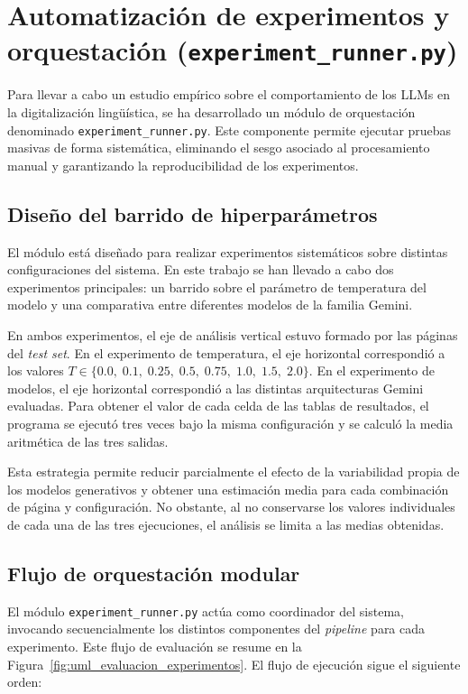 \section{Automatización de experimentos y orquestación (\texttt{experiment\_runner.py})}

Para llevar a cabo un estudio empírico sobre el comportamiento de los LLMs en la digitalización lingüística, se ha desarrollado un módulo de orquestación denominado \texttt{experiment\_runner.py}. Este componente permite ejecutar pruebas masivas de forma sistemática, eliminando el sesgo asociado al procesamiento manual y garantizando la reproducibilidad de los experimentos.

\subsection{Diseño del barrido de hiperparámetros}

El módulo está diseñado para realizar experimentos sistemáticos sobre distintas configuraciones del sistema. En este trabajo se han llevado a cabo dos experimentos principales: un barrido sobre el parámetro de temperatura del modelo y una comparativa entre diferentes modelos de la familia Gemini.

En ambos experimentos, el eje de análisis vertical estuvo formado por las páginas del \textit{test set}. En el experimento de temperatura, el eje horizontal correspondió a los valores \(T \in \{0.0,\;0.1,\;0.25,\;0.5,\;0.75,\;1.0,\;1.5,\;2.0\}\). En el experimento de modelos, el eje horizontal correspondió a las distintas arquitecturas Gemini evaluadas. Para obtener el valor de cada celda de las tablas de resultados, el programa se ejecutó tres veces bajo la misma configuración y se calculó la media aritmética de las tres salidas.

Esta estrategia permite reducir parcialmente el efecto de la variabilidad propia de los modelos generativos y obtener una estimación media para cada combinación de página y configuración. No obstante, al no conservarse los valores individuales de cada una de las tres ejecuciones, el análisis se limita a las medias obtenidas.

\subsection{Flujo de orquestación modular}

El módulo \texttt{experiment\_runner.py} actúa como coordinador del sistema, invocando secuencialmente los distintos componentes del \textit{pipeline} para cada experimento. Este flujo de evaluación se resume en la Figura~\ref{fig:uml_evaluacion_experimentos}.
El flujo de ejecución sigue el siguiente orden:

